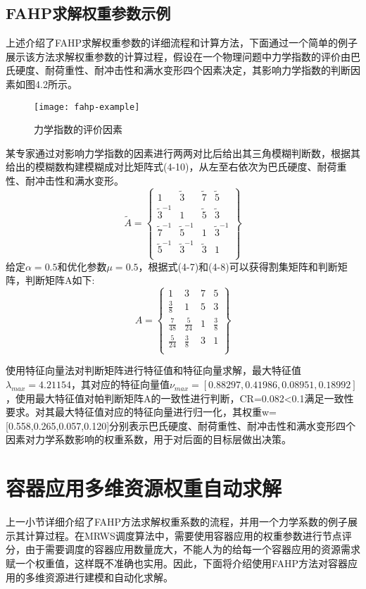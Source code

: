 \subsection{FAHP求解权重参数示例}
上述介绍了FAHP求解权重参数的详细流程和计算方法，下面通过一个简单的例子展示该方法求解权重参数的计算过程，假设在一个物理问题中力学指数的评价由巴氏硬度、耐荷重性、耐冲击性和满水变形四个因素决定，其影响力学指数的判断因素如图4.2所示。
\begin{figure}[H] %
	\centering
	\texttt{[image: fahp-example]}
	\caption{力学指数的评价因素}
\end{figure}
某专家通过对影响力学指数的因素进行两两对比后给出其三角模糊判断数，根据其给出的模糊数构建模糊成对比矩阵式(4-10)，从左至右依次为巴氏硬度、耐荷重性、耐冲击性和满水变形。
\begin{equation}
\widetilde{A} = \left\{\begin{array}{cccc}
1 & \widetilde{3} & \widetilde{7} & \widetilde{5}  \\
\widetilde{3}^{-1} & 1 & \widetilde{5} & \widetilde{3} \\
\widetilde{7}^{-1} & \widetilde{5}^{-1} & 1 & \widetilde{3}^{-1} \\
\widetilde{5}^{-1} & \widetilde{3}^{-1} & \widetilde{3} & 1 \\
\end{array}\right\}
\end{equation}
给定$\alpha=0.5$和优化参数$\mu=0.5$，根据式(4-7)和(4-8)可以获得割集矩阵和判断矩阵，判断矩阵A如下:
\begin{equation}
A = \left\{\begin{array}{cccc}
1 & 3 & 7 & 5 \\
\frac{3}{8} & 1 & 5 & 3 \\
\frac{7}{48} & \frac{5}{24} & 1 & \frac{3}{8} \\
\frac{5}{24} & \frac{3}{8} & 3 & 1 \\
\end{array}\right\}
\end{equation}

使用特征向量法对判断矩阵进行特征值和特征向量求解，最大特征值$\lambda_{max}=4.21154$，其对应的特征向量值$\nu_{max}=[0.88297,0.41986,0.08951,0.18992]$，使用最大特征值对帕判断矩阵A的一致性进行判断，CR=0.082<0.1满足一致性要求。对其最大特征值对应的特征向量进行归一化，其权重w=[0.558,0.265,0.057,0.120]分别表示巴氏硬度、耐荷重性、耐冲击性和满水变形四个因素对力学系数影响的权重系数，用于对后面的目标层做出决策。

\section{容器应用多维资源权重自动求解}
上一小节详细介绍了FAHP方法求解权重系数的流程，并用一个力学系数的例子展示其计算过程。在MRWS调度算法中，需要使用容器应用的权重参数进行节点评分，由于需要调度的容器应用数量庞大，不能人为的给每一个容器应用的资源需求赋一个权重值，这样既不准确也实用。因此，下面将介绍使用FAHP方法对容器应用的多维资源进行建模和自动化求解。
